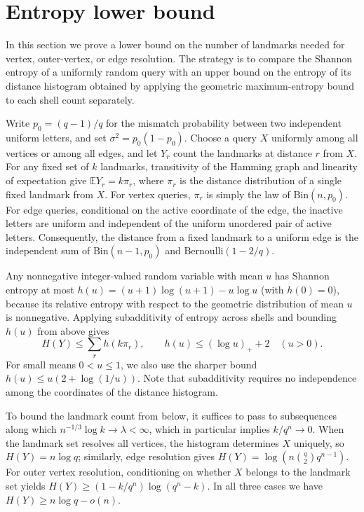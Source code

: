 \section{Entropy lower bound}\label{app:entropy}
In this section we prove a lower bound on the number of landmarks needed for vertex, outer-vertex, or edge resolution. The strategy is to compare the Shannon entropy of a uniformly random query with an upper bound on the entropy of its distance histogram obtained by applying the geometric maximum-entropy bound to each shell count separately.

Write $p_0=(q-1)/q$ for the mismatch probability between two independent uniform letters, and set $\sigma^2=p_0(1-p_0)$. Choose a query $X$ uniformly among all vertices or among all edges, and let $Y_r$ count the landmarks at distance $r$ from $X$. For any fixed set of $k$ landmarks, transitivity of the Hamming graph and linearity of expectation give $\mathbb EY_r=k\pi_r$, where $\pi_r$ is the distance distribution of a single fixed landmark from $X$. For vertex queries, $\pi_r$ is simply the law of $\mathrm{Bin}(n,p_0)$. For edge queries, conditional on the active coordinate of the edge, the inactive letters are uniform and independent of the uniform unordered pair of active letters. Consequently, the distance from a fixed landmark to a uniform edge is the independent sum of $\mathrm{Bin}(n-1,p_0)$ and $\mathrm{Bernoulli}(1-2/q)$.

Any nonnegative integer-valued random variable with mean $u$ has Shannon entropy at most $h(u)=(u+1)\log(u+1)-u\log u$ (with $h(0)=0$), because its relative entropy with respect to the geometric distribution of mean $u$ is nonnegative. Applying subadditivity of entropy across shells and bounding $h(u)$ from above gives
\[
 H(Y)\le\sum_r h(k\pi_r),\qquad h(u)\le (\log u)_++2\quad (u>0).
\]
For small means $0<u\le1$, we also use the sharper bound $h(u)\le u(2+\log(1/u))$. Note that subadditivity requires no independence among the coordinates of the distance histogram.

To bound the landmark count from below, it suffices to pass to subsequences along which $n^{-1/3}\log k\to\lambda<\infty$, which in particular implies $k/q^n\to0$. When the landmark set resolves all vertices, the histogram determines $X$ uniquely, so $H(Y)=n\log q$; similarly, edge resolution gives $H(Y)=\log(n\binom q2 q^{n-1})$. For outer vertex resolution, conditioning on whether $X$ belongs to the landmark set yields $H(Y)\ge(1-k/q^n)\log(q^n-k)$. In all three cases we have $H(Y)\ge n\log q-o(n)$.

